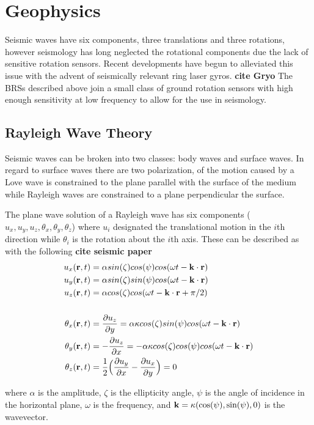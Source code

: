 \documentclass [12pt, proquest]{uwthesis}[2019]
\begin{document}
\section{Geophysics}
Seismic waves have six components, three translations and three rotations, however seismology has long neglected the rotational components due the lack of sensitive rotation sensors. Recent developments have begun to alleviated this issue with the advent of seismically relevant ring laser gyros. \textbf{cite Gryo} The BRSs described above join a small class of ground rotation sensors with high enough sensitivity at low frequency to allow for the use in seismology.
\subsection{Rayleigh Wave Theory}

Seismic waves can be broken into two classes: body waves and surface waves. In regard to surface waves there are two polarization, of the motion caused by a Love wave is constrained to the plane parallel with the surface of the medium while Rayleigh waves are constrained to a plane perpendicular the surface. 

The plane wave solution of a Rayleigh wave has six components ($u_x, u_y, u_z, \theta_x, \theta_y, \theta_z$) where $u_i$ designated the translational motion in the $i$th direction while $\theta_i$ is the rotation about the $i$th axis.
These can be described as with the following \textbf{cite seismic paper}
\begin{align}
u_x({\bf r} ,t)&=\alpha sin(\zeta) cos(\psi) cos(\omega t-{\bf k}\cdot{\bf r})\\
u_y({\bf r} ,t)&=\alpha sin(\zeta) sin(\psi) cos(\omega t-{\bf k}\cdot{\bf r})\\
u_z({\bf r} ,t)&=\alpha cos(\zeta) cos(\omega t-{\bf k}\cdot{\bf r}+\pi/2)\label{ZEq}\\
\notag \\
\theta_x({\bf r} ,t)&=\frac{\partial u_z}{\partial y}=\alpha \kappa cos(\zeta) sin(\psi) cos(\omega t-{\bf k}\cdot{\bf r})\label{TiltXEq}\\
\theta_y({\bf r} ,t)&=-\frac{\partial u_z}{\partial x}=-\alpha \kappa cos(\zeta) cos(\psi) cos(\omega t-{\bf k}\cdot{\bf r})\\
\theta_z({\bf r} ,t)&=\frac{1}{2}\Big(\frac{\partial u_y}{\partial x}-\frac{\partial u_x}{\partial y}\Big)=0
\end{align}

where $\alpha$ is the amplitude, $\zeta$ is the ellipticity angle, $\psi$ is the angle of incidence in the horizontal plane, $\omega$ is the frequency, and $\bf{k}=\kappa (\text{cos}(\psi),\text{sin}(\psi),\text{0})$ is the wavevector.
\end{document}
